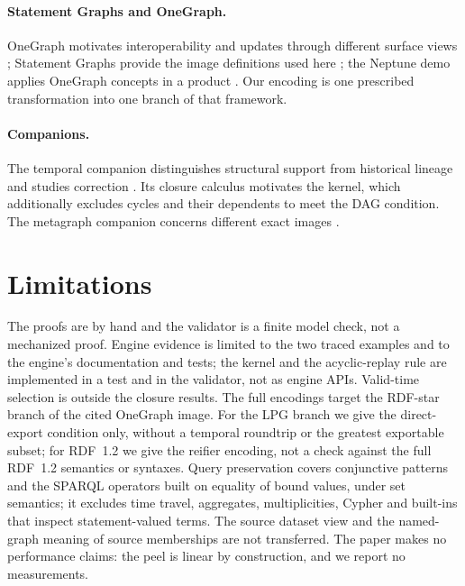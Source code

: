 \documentclass[11pt]{article}
\theoremstyle{plain}
\theoremstyle{definition}
\theoremstyle{remark}
\begin{document}
\paragraph{Statement Graphs and OneGraph.}
OneGraph motivates interoperability and updates through different surface views
\cite{lassila2023onegraph}; Statement Graphs provide the image definitions used here
\cite{gelling2023bridging,gelling2024statement}; the Neptune demo applies OneGraph
concepts in a product \cite{schmidt2024opencypher}. Our encoding is one prescribed
transformation into one branch of that framework.

\paragraph{Companions.}
The temporal companion distinguishes structural support from historical lineage and
studies correction \cite{pavlyshyn2026lbg}. Its closure calculus motivates the
kernel, which additionally excludes cycles and their dependents to meet the DAG
condition. The metagraph companion concerns different exact images
\cite{pavlyshyn2026metagraphenc}.

\section{Limitations}\label{sec:limits}
The proofs are by hand and the validator is a finite model check, not a mechanized
proof. Engine evidence is limited to the two traced examples and to the engine's
documentation and tests; the kernel and the acyclic-replay rule are implemented in a
test and in the validator, not as engine APIs. Valid-time selection is outside the
closure results. The full encodings target the RDF-star branch of the cited OneGraph
image. For the LPG branch we give the direct-export condition only, without a
temporal roundtrip or the greatest exportable subset; for RDF~1.2 we give the
reifier encoding, not a check against the full RDF~1.2 semantics or syntaxes. Query
preservation covers conjunctive patterns and the SPARQL operators built on equality
of bound values, under set semantics; it excludes time travel, aggregates,
multiplicities, Cypher and built-ins that inspect statement-valued terms. The source
dataset view and the named-graph meaning of source memberships are not transferred.
The paper makes no performance claims: the peel is linear by construction, and we
report no measurements.
\end{document}
